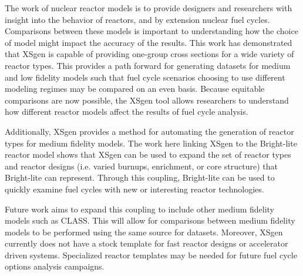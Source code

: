 \documentclass{article}
\begin{document}
The work of nuclear reactor models is to provide designers and researchers with insight
into the behavior of reactors, and by extension nuclear fuel cycles. Comparisons between
these models is important to understanding how the choice of model might impact the
accuracy of the results. This work has demonstrated that XSgen is capable of
providing one-group cross sections for a wide variety of reactor types.
This provides a path forward for generating datasets for medium and low fidelity models
such that fuel cycle scenarios choosing to use different modeling regimes may be compared
on an even basis. Because equitable comparisons are now possible, the XSgen tool allows
researchers to understand how different reactor models affect the results of fuel cycle analysis.

Additionally, XSgen provides a method for automating the generation of reactor types for
medium fidelity models. The work here linking XSgen to the Bright-lite reactor model shows
that XSgen can be used to expand the set of reactor types and reactor designs
(i.e. varied burnups, enrichment, or core structure) that Bright-lite can represent.
Through this coupling, Bright-lite can be used to quickly examine fuel cycles with new or
interesting reactor technologies.

Future work aims to expand this coupling to include other medium fidelity models such as CLASS.
This will allow for comparisons between medium fidelity models to be performed using the
same source for datasets. Moreover, XSgen currently does not have a stock template for
fast reactor designs or accelerator driven systems. Specialized reactor templates may be
needed for future fuel cycle options analysis campaigns.



\end{document}
